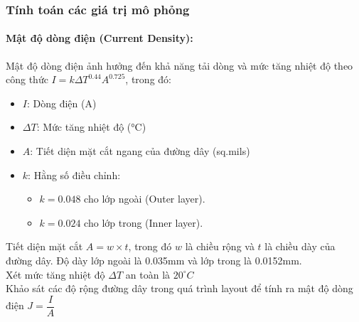         \subsubsection{Tính toán các giá trị mô phỏng}
            \paragraph{Mật độ dòng điện (Current Density):}
                Mật độ dòng điện ảnh hưởng đến khả năng tải dòng và mức tăng nhiệt độ theo công thức $I = k\Delta T^{0.44}A^{0.725}$, trong đó\cite{PrintedBoardDesignIpc2221A}:
                \begin{itemize}
                    \item $I$: Dòng điện (A)
                    \item $\Delta T$: Mức tăng nhiệt độ (°C)
                    \item $A$: Tiết diện mặt cắt ngang của đường dây (sq.mils)  
                    \item $k$: Hằng số điều chỉnh:
                    \begin{itemize}
                        \item $k = 0.048$ cho lớp ngoài (Outer layer).
                        \item $k = 0.024$ cho lớp trong (Inner layer).
                    \end{itemize}
                \end{itemize}
                
                Tiết diện mặt cắt $A = w \times t$, trong đó $w$ là chiều rộng và $t$ là chiều dày của đường dây. Độ dày lớp ngoài là 0.035mm và lớp trong là 0.0152mm.\\
                Xét mức tăng nhiệt độ $\Delta T$ an toàn là $20^{\circ}C$\\
                Khảo sát các độ rộng đường dây trong quá trình layout để tính ra mật độ dòng điện $J = \dfrac{I}{A}$\\

